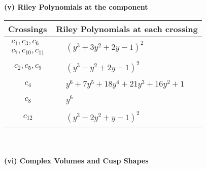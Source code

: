 \documentclass[1p]{elsarticle_modified}
\theoremstyle{definition}
\begin{document}
\newpage\renewcommand{\arraystretch}{1}
\flushleft \textbf{(v) Riley Polynomials at the component}\newline \\
\begin{tabular}{m{50pt}|m{274pt}}
Crossings & \hspace{64pt}Riley Polynomials at each crossing \\
\hline $$\begin{aligned}c_{1},c_{3},c_{6}\\c_{7},c_{10},c_{11}\end{aligned}$$&$\begin{aligned}
&(y^3+3 y^2+2 y-1)^2
\end{aligned}$\\
\hline $$\begin{aligned}c_{2},c_{5},c_{9}\end{aligned}$$&$\begin{aligned}
&(y^3- y^2+2 y-1)^2
\end{aligned}$\\
\hline $$\begin{aligned}c_{4}\end{aligned}$$&$\begin{aligned}
&y^6+7 y^5+18 y^4+21 y^3+16 y^2+1
\end{aligned}$\\
\hline $$\begin{aligned}c_{8}\end{aligned}$$&$\begin{aligned}
&y^6
\end{aligned}$\\
\hline $$\begin{aligned}c_{12}\end{aligned}$$&$\begin{aligned}
&(y^3-2 y^2+y-1)^2
\end{aligned}$\\
\hline
\end{tabular}\\~\\
\newpage\flushleft \textbf{(vi) Complex Volumes and Cusp Shapes}
\end{document}
